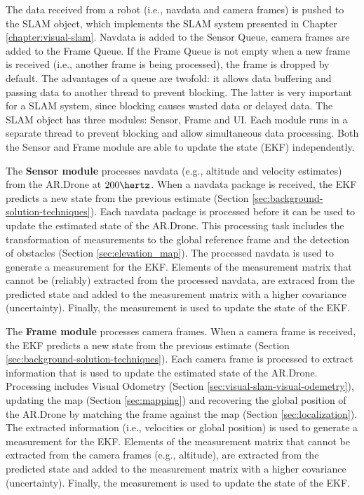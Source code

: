 The data received from a robot (i.e., navdata and camera frames) is pushed to the SLAM object, which implements the SLAM system presented in Chapter \ref{chapter:visual-slam}.
Navdata is added to the Sensor Queue, camera frames are added to the Frame Queue.
If the Frame Queue is not empty when a new frame is received (i.e., another frame is being processed), the frame is dropped by default.
The advantages of a queue are twofold: it allows data buffering and passing data to another thread to prevent blocking.
The latter is very important for a SLAM system, since blocking causes wasted data or delayed data.
The SLAM object has three modules: Sensor, Frame and UI.
Each module runs in a separate thread to prevent blocking and allow simultaneous data processing.
Both the Sensor and Frame module are able to update the state (EKF) independently.

The \textbf{Sensor module} processes navdata (e.g., altitude and velocity estimates) from the AR.Drone at $200\hertz$.
When a navdata package is received, the EKF predicts a new state from the previous estimate (Section \ref{sec:background-solution-techniques}).
Each navdata package is processed before it can be used to update the estimated state of the AR.Drone.
This processing task includes the transformation of measurements to the global reference frame and the detection of obstacles (Section \ref{sec:elevation_map}).
The processed navdata is used to generate a measurement for the EKF.
Elements of the measurement matrix that cannot be (reliably) extracted from the processed navdata, are extraced from the predicted state and added to the measurement matrix with a higher covariance (uncertainty).
Finally, the measurement is used to update the state of the EKF.

The \textbf{Frame module} processes camera frames.
When a camera frame is received, the EKF predicts a new state from the previous estimate (Section \ref{sec:background-solution-techniques}).
Each camera frame is processed to extract information that is used to update the estimated state of the AR.Drone.
Processing includes Visual Odometry (Section \ref{sec:visual-slam-visual-odemetry}), updating the map (Section \ref{sec:mapping}) and recovering the global position of the AR.Drone by matching the frame against the map (Section \ref{sec:localization}).
The extracted information (i.e., velocities or global position) is used to generate a measurement for the EKF.
Elements of the measurement matrix that cannot be extracted from the camera frames (e.g., altitude), are extracted from the predicted state and added to the measurement matrix with a higher covariance (uncertainty).
Finally, the measurement is used to update the state of the EKF.

